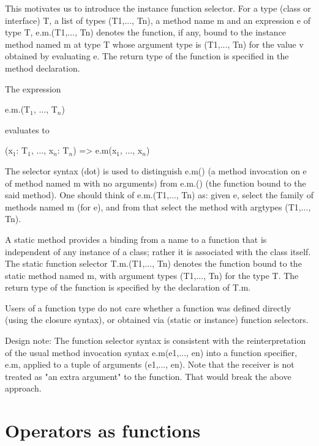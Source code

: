 This motivates us to introduce the instance function selector. For a
type (class or interface) T, a list of types (T1,..., Tn), a method name
m and an expression e of type T, e.m.(T1,..., Tn) denotes the function,
if any, bound to the instance method named m at type T whose argument
type is (T1,..., Tn) for the value v obtained by evaluating e. The
return type of the function is specified in the method declaration.

The expression

\begin{xtenmath}
e.m.(T$_1$, $\dots$, T$_n$)
\end{xtenmath}

evaluates to

\begin{xtenmath}
(x$_1$: T$_1$, $\dots$, x$_n$: T$_n$) => e.m(x$_1$, $\dots$, x$_n$)
\end{xtenmath}

\begin{note}
The selector syntax (dot) is used to distinguish e.m() (a
method invocation on e of method named m with no arguments) from e.m.()
(the function bound to the said method). One should think of
e.m.(T1,..., Tn) as: given e, select the family of methods named m (for
e), and from that select the method with argtypes (T1,..., Tn).
\end{note}

A static method provides a binding from a name to a function that is
independent of any instance of a class; rather it is associated with the
class itself. The static function selector T.m.(T1,..., Tn) denotes the
function bound to the static method named m, with argument types
(T1,..., Tn) for the type T. The return type of the function is
specified by the declaration of T.m.

Users of a function type do not care whether a function was defined
directly (using the closure syntax), or obtained via (static or
instance) function selectors.

\begin{note}
Design note: The function selector syntax is consistent with the
reinterpretation of the usual method invocation syntax e.m(e1,..., en)
into a function specifier, e.m, applied to a tuple of arguments (e1,...,
en). Note that the receiver is not treated as "an extra argument" to the
function. That would break the above approach.
\end{note}


\section{Operators as functions}

